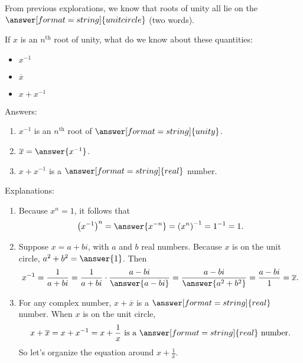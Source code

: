 \documentclass[space,nooutcomes]{ximera}
\begin{document}
\begin{problem}
From previous explorations, we know that roots of unity all lie on the $\answer[format=string]{unit circle}$ (two words). 

If $x$ is an $n^\text{th}$ root of unity, what do we know about these quantities: 
\begin{itemize}
\item $x^{-1}$ 
\item $\overline{x}$
\item $x+x^{-1}$
\end{itemize}

Answers:
\begin{enumerate}
\item $x^{-1}$ is an $n^\text{th}$ root of $\answer[format=string]{unity}$.  
\item $\overline{x} = \answer{x^{-1}}$. 
\item $x+x^{-1}$ is a $\answer[format=string]{real}$ number.  
\end{enumerate}
\begin{problem}
Explanations: 
\begin{enumerate}
\item Because $x^n=1$, it follows that 
\[
\left(x^{-1}\right)^n = \answer{x^{-n}} = \left(x^n\right)^{-1} = 1^{-1} = 1. 
\]
\item Suppose $x=a+bi$, with $a$ and $b$ real numbers. Because $x$ is on the unit circle, $a^2+b^2 = \answer{1}$.  Then 
\[
x^{-1}=\frac{1}{a+bi}=\frac{1}{a+bi}\cdot\frac{a-bi}{\answer{a-bi}}=\frac{a-bi}{\answer{a^2+b^2}}=\frac{a-bi}{1}=\overline{x}.
\]
\item For any complex number, $x+\overline{x}$ is a $\answer[format=string]{real}$ number.  When $x$ is on the unit circle, 
\[
x + \overline{x} = x + x^{-1} = x + \frac{1}{x}\text{ is a }\answer[format=string]{real}\text{ number.}
\]
So let's organize the equation around $x + \frac{1}{x}$.  
\end{enumerate}
\end{problem}
\end{problem}
\end{document}
